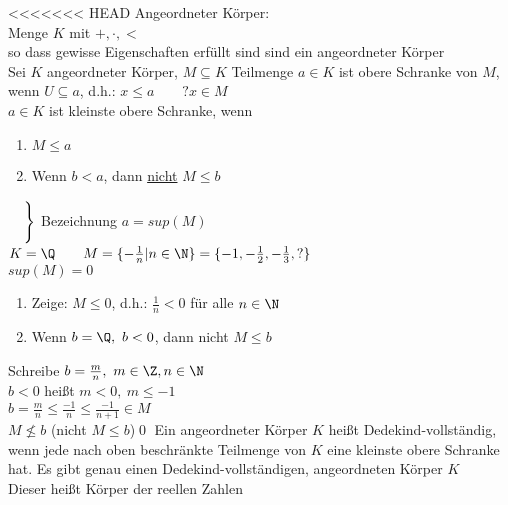 <<<<<<< HEAD
Angeordneter Körper:\\
Menge $K$ mit $+, ·, <$\\
so dass gewisse Eigenschaften erfüllt sind
\bsp
\Q{} sind ein angeordneter Körper\\
Sei $K$ angeordneter Körper, $M\subseteq K$ Teilmenge $a\in K$ ist obere Schranke von $M$, wenn $U\subseteq a$, d.h.: $x\leq a\qquad ?x\in M$\\
$a\in K$ ist kleinste obere Schranke, wenn\\
\begin{enumerate}
\item{$M\leq a$}
\item{Wenn $b < a$, dann \underline{nicht} $M\leq b$}
\end{enumerate}
\vspace*{-9.5ex}\hspace*{15.5em}
$\left.
\begin{array}{l}
{}\vspace*{2ex}\\{}
\end{array}
\right\}$
\vspace*{-5ex}Bezeichnung $a=sup(M)$
\vspace*{5ex}
%
\bsp
$K=\Q\qquad M=\{-\frac{1}{n}|n\in\N\}=\{-1,-\frac{1}{2},-\frac{1}{3},?\}$\\
$sup(M)=0$
\bew
\begin{enumerate}
\item {Zeige: $M \leq 0$, d.h.: $\frac{1}{n}<0$ für alle $n\in\N$\ok}
\item {Wenn $b=\Q,\ b<0$, dann nicht $M\leq b$}
\end{enumerate}
Schreibe $b=\frac{m}{n},\ m\in\Z, n\in\N$\\[1ex]
$b<0$ heißt $m<0,\ m\leq -1$\\[1ex]
$b=\frac{m}{n} \leq \frac{-1}{n} \leq \frac{-1}{n+1}\in M$\\[1ex]
\Rarr{} $M\not\leq b$ (nicht $M\leq b$)\qed
%
\Def
Ein angeordneter Körper $K$ heißt Dedekind-vollständig, wenn jede nach oben beschränkte Teilmenge von $K$ eine kleinste obere Schranke hat.
\Satz
Es gibt genau einen Dedekind-vollständigen, angeordneten Körper $K$\\
Dieser heißt Körper der reellen Zahlen\\
